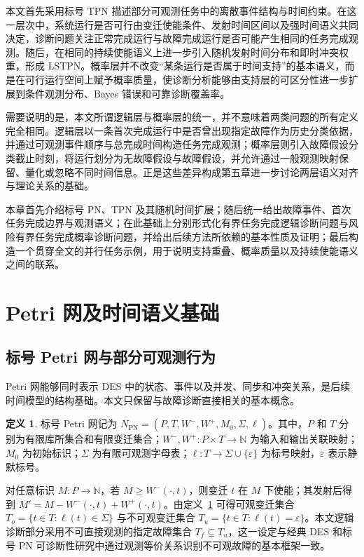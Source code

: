 \documentclass[master,fontset=ubuntu]{shnuthesis}
\theoremstyle{definition}
\newtheorem{thesisdefinition}{定义}
\begin{document}
本文首先采用标号 TPN 描述部分可观测任务中的离散事件结构与时间约束。在这一层次中，系统运行是否可行由变迁使能条件、发射时间区间以及强时间语义共同决定，诊断问题关注正常完成运行与故障完成运行是否可能产生相同的任务完成观测。随后，在相同的持续使能语义上进一步引入随机发射时间分布和即时冲突权重，形成 LSTPN。概率层并不改变“某条运行是否属于时间支持”的基本语义，而是在可行运行空间上赋予概率质量，使诊断分析能够由支持层的可区分性进一步扩展到条件观测分布、Bayes 错误和可靠诊断覆盖率。

需要说明的是，本文所谓逻辑层与概率层的统一，并不意味着两类问题的所有定义完全相同。逻辑层以一条首次完成运行中是否曾出现指定故障作为历史分类依据，并通过可观测事件顺序与总完成时间构造任务完成观测；概率层则引入故障假设分类截止时刻，将运行划分为无故障假设与故障假设，并允许通过一般观测映射保留、量化或忽略不同时间信息。正是这些差异构成第五章进一步讨论两层语义对齐与理论关系的基础。

本章首先介绍标号 PN、TPN 及其随机时间扩展；随后统一给出故障事件、首次任务完成边界与观测语义；在此基础上分别形式化有界任务完成逻辑诊断问题与风险有界任务完成概率诊断问题，并给出后续方法所依赖的基本性质及证明；最后构造一个贯穿全文的并行任务示例，用于说明支持重叠、概率质量以及持续使能语义之间的联系。

\section{Petri 网及时间语义基础}

\subsection{标号 Petri 网与部分可观测行为}

Petri 网能够同时表示 DES 中的状态、事件以及并发、同步和冲突关系，是后续时间模型的结构基础\cite{Murata1989}。本文只保留与故障诊断直接相关的基本概念。

\begin{thesisdefinition}
\label{def:lpn}
标号 Petri 网记为 \(N_{\mathrm{PN}}=(P,T,W^-,W^+,M_0,\Sigma,\ell)\)。其中，\(P\) 和 \(T\) 分别为有限库所集合和有限变迁集合；\(W^-,W^+:P\times T\rightarrow\mathbb N\) 为输入和输出关联映射；\(M_0\) 为初始标识；\(\Sigma\) 为有限可观测字母表；\(\ell:T\rightarrow\Sigma\cup\{\varepsilon\}\) 为标号映射，\(\varepsilon\) 表示静默标号。
\end{thesisdefinition}

对任意标识 \(M:P\rightarrow\mathbb N\)，若 \(M\geq W^-(\cdot,t)\)，则变迁 \(t\) 在 \(M\) 下使能；其发射后得到 \(M'=M-W^-(\cdot,t)+W^+(\cdot,t)\)。由定义~\ref{def:lpn} 可得可观变迁集合 \(T_o=\{t\in T:\ell(t)\in\Sigma\}\) 与不可观变迁集合 \(T_u=\{t\in T:\ell(t)=\varepsilon\}\)。本文逻辑诊断部分采用不可直接观测的指定故障集合 \(T_f\subseteq T_u\)，这一设定与经典 DES 和标号 PN 可诊断性研究中通过观测等价关系识别不可观故障的基本框架一致\cite{Sampath1995,Cabasino2012,Cabasino2014}。
\end{document}

